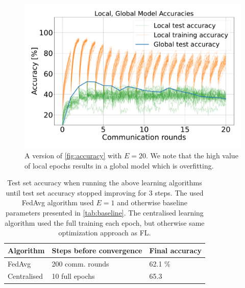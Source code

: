 \documentclass{article}
\begin{document}
\begin{figure}[htb!]
    \centering
        \includegraphics[width=\linewidth]{imgs/accuracy.pdf}
    \caption{
        A version of \ref{fig:accuracy} with $E=20$.
        We note that the high value of local epochs results in a global model which is overfitting.
    }
    \label{fig:accuracy2}
\end{figure}\noindent

\begin{table}[htb!]
    \centering
        \begin{tabular}{lll}
            Algorithm & Steps before convergence & Final accuracy\\
            \hline
            FedAvg & 200 comm. rounds & 62.1 \%\\
            Centralised & 10 full epochs & 65.3
        \end{tabular}
    \caption{
        Test set accuracy when running the above learning algorithms until test set accuracy stopped improving for 3 steps.
        The used FedAvg algorithm used $E=1$ and otherwise baseline parameters presented in \ref{tab:baseline}.
        The centralised learning algorithm used the full training each epoch, but otherwise same optimization approach as FL.
    }
    \label{app:centralised}
\end{table}\noindent
\end{document}
